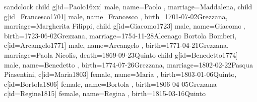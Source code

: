 \documentclass{article}
\begin{document}
\begin{midpage}
\begin{center}

\begin{genealogypicture}[
    processing=database,
    database format=full,
    node size=3.5cm,
    level size=2.8cm,
    level distance=6mm,
    list separators hang=3mm,
    name font=\bfseries,
    surn code={\textcolor{black!50!black}{#1}},
    place text={\newline}{},
    date format=d month yyyy,
    tcbset={male/.style={colframe=blue,colback=blue!5},
    female/.style={colframe=red,colback=red!5}},
    box={fit basedim=7pt,boxsep=2pt,segmentation style=solid,
        halign=left,before upper=\parskip1pt,
        \gtrDBsex,
    },
]
sandclock
{
    child{
        g[id=Paolo16xx]{
            male,
            name={Paolo },
            marriage={Maddalena}{},
        }
        child{
            g[id=Francesco1701]{
                male,
                name={Francesco },
                birth={1701-07-02}{Grezzana},
                marriage={Margherita Filippi}{},
            }
            child{
                g[id=Giacomo1723]{
                    male,
                    name={Giacomo },
                    birth={1723-06-02}{Grezzana},
                    marriage={1754-11-28}{Alcenago \newline Bortola Bomberi},
                }
                c[id=Arcangelo1771]{
                    male,
                    name={Arcangelo },
                    birth={1771-04-21}{Grezzana},
                    marriage={Paola Nicolis}{},
                    death={1869-09-23}{Quinto}
                }
                child{
                    g[id=Benedetto1774]{
                        male,
                        name={Benedetto },
                        birth={1774-07-26}{Grezzana},
                        marriage={1802-02-22}{Pasqua Piasentini},
                    }
                    c[id=Maria1803]{
                        female,
                        name={Maria },
                        birth={1803-01-06}{Quinto},
                    }
                    c[id=Bortola1806]{
                        female,
                        name={Bortola },
                        birth={1806-04-05}{Grezzana}
                    }
                    c[id=Regine1815]{
                        female,
                        name={Regina },
                        birth={1815-03-16}{Quinto}
}}}}}}
\end{genealogypicture}
\end{center}
\end{midpage}
\end{document}
